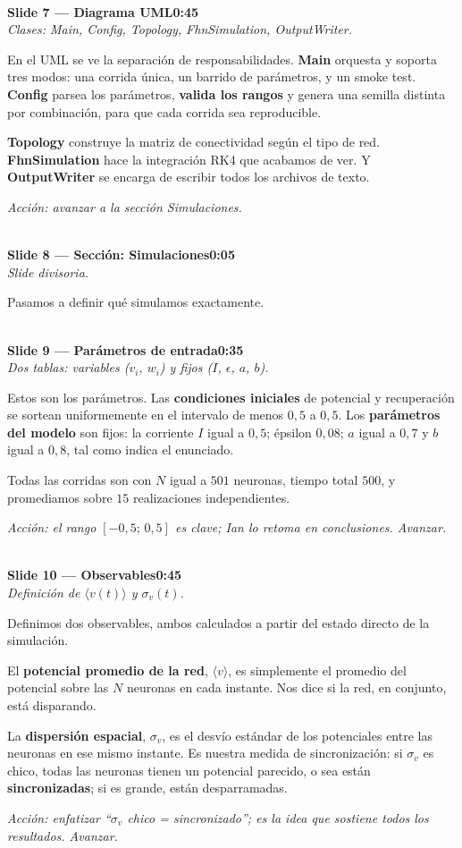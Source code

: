 \documentclass[11pt]{article}
\newcommand{\slide}[3]{%
  \vspace{6pt}%
  \noindent{\color{azulOscuro}\rule{3.2cm}{2pt}}\\[2pt]
  \noindent\textbf{\color{azulOscuro}#1}\hfill\textbf{\color{azulMedio}#3}\\[-2pt]
  {\small\color{grisTexto}\itshape #2}\\[2pt]
}
\begin{document}
\slide{Slide 7 — Diagrama UML}{Clases: Main, Config, Topology, FhnSimulation, OutputWriter.}{0:45}
\begin{guion}
En el UML se ve la separación de responsabilidades. \textbf{Main} orquesta y soporta tres modos: una corrida única, un barrido de parámetros, y un smoke test. \textbf{Config} parsea los parámetros, \textbf{valida los rangos} y genera una semilla distinta por combinación, para que cada corrida sea reproducible.

\textbf{Topology} construye la matriz de conectividad según el tipo de red. \textbf{FhnSimulation} hace la integración RK4 que acabamos de ver. Y \textbf{OutputWriter} se encarga de escribir todos los archivos de texto.
\end{guion}
\textit{Acción: avanzar a la sección Simulaciones.}

\slide{Slide 8 — Sección: Simulaciones}{Slide divisoria.}{0:05}
\begin{guion}
Pasamos a definir qué simulamos exactamente.
\end{guion}

\slide{Slide 9 — Parámetros de entrada}{Dos tablas: variables ($v_i$, $w_i$) y fijos ($I$, $\epsilon$, $a$, $b$).}{0:35}
\begin{guion}
Estos son los parámetros. Las \textbf{condiciones iniciales} de potencial y recuperación se sortean uniformemente en el intervalo de menos $0{,}5$ a $0{,}5$. Los \textbf{parámetros del modelo} son fijos: la corriente $I$ igual a $0{,}5$; épsilon $0{,}08$; $a$ igual a $0{,}7$ y $b$ igual a $0{,}8$, tal como indica el enunciado.

Todas las corridas son con $N$ igual a $501$ neuronas, tiempo total $500$, y promediamos sobre $15$ realizaciones independientes.
\end{guion}
\textit{Acción: el rango $[-0{,}5;\,0{,}5]$ es clave; Ian lo retoma en conclusiones. Avanzar.}

\slide{Slide 10 — Observables}{Definición de $\langle v(t)\rangle$ y $\sigma_v(t)$.}{0:45}
\begin{guion}
Definimos dos observables, ambos calculados a partir del estado directo de la simulación.

El \textbf{potencial promedio de la red}, $\langle v\rangle$, es simplemente el promedio del potencial sobre las $N$ neuronas en cada instante. Nos dice si la red, en conjunto, está disparando.

La \textbf{dispersión espacial}, $\sigma_v$, es el desvío estándar de los potenciales entre las neuronas en ese mismo instante. Es nuestra medida de sincronización: si $\sigma_v$ es chico, todas las neuronas tienen un potencial parecido, o sea están \textbf{sincronizadas}; si es grande, están desparramadas.
\end{guion}
\textit{Acción: enfatizar ``$\sigma_v$ chico = sincronizado''; es la idea que sostiene todos los resultados. Avanzar.}
\end{document}

